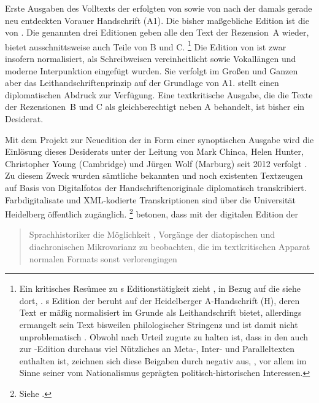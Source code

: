 Erste Ausgaben des Volltexts der \KC{} erfolgten von \citet{massmann:kukb}
sowie von \citet{diemer1849} nach der damals gerade neu entdeckten Vorauer
Handschrift (A1). Die bisher maßgebliche Edition ist die von
\citet{schroeder1895}. Die genannten drei Editionen geben alle den Text
der Rezension~A wieder, \citeauthor{massmann:kukb} bietet ausschnittsweise auch
Teile von B und C.%
%
	\footnote{Ein kritisches Resümee zu \citeauthor{massmann:kukb}s
		Editionstätigkeit zieht \citet{wolf2023}, in Bezug auf die
		\KC{} siehe dort, .
		\citeauthor{massmann:kukb}s Edition der \KC{} beruht auf der
		Heidelberger A-Handschrift (H), deren Text er mäßig normalisiert im
		Grunde als Leithandschrift bietet, allerdings ermangelt sein Text
		bisweilen philologischer Stringenz und ist damit nicht unproblematisch
		\autocite[125--126]{wolf2023}. Obwohl \citeauthor{massmann:kukb} nach
		 Urteil zugute zu halten ist, dass in den
		 auch zur \KC{}-Edition durchaus
		viel Nützliches an Meta-, Inter- und Paralleltexten enthalten ist,
		zeichnen sich diese Beigaben durch  negativ aus,
		, vor allem im
		Sinne seiner vom Nationalismus geprägten politisch-historischen
		Interessen.%
	}
%
Die Edition von \citeauthor{schroeder1895} ist zwar insofern normalisiert, als
Schreibweisen vereinheitlicht sowie Vokal\-längen und moderne Interpunktion
eingefügt wurden. Sie verfolgt im Großen und Ganzen aber das
Leit\-handschriften\-prinzip auf der Grundlage von A1. \citeauthor{diemer1849}
stellt einen diplomatischen Abdruck zur Verfügung. Eine textkritische Ausgabe,
die die Texte der Rezensionen~B und C als gleichberechtigt neben A behandelt,
ist bisher ein Desiderat.

Mit dem Projekt zur Neuedition der \KC{} in Form einer synoptischen Ausgabe
wird die Einlösung dieses Desiderats unter der Leitung von Mark Chinca, Helen
Hunter, Christopher Young (Cambridge) und Jürgen Wolf (Marburg) seit 2012
verfolgt \autocite{chincaetal2019b}. Zu diesem Zweck wurden sämtliche bekannten
und noch existenten Textzeugen auf Basis von Digitalfotos der
Handschriften\-originale diplomatisch transkribiert. Farb\-digitalisate und
XML-ko\-dier\-te Transkriptionen sind über die Universität Heidelberg
öffentlich zugänglich.%
%
	\footnote{Siehe \nocite{kcdigital}.}
%
\citet[287]{chincaetal2019b} betonen, dass mit der digitalen Edition der
\KC{} \blockquote{Sprachhistoriker \textelp{} die Möglichkeit ,
Vorgänge der dia\-topischen und dia\-chronischen Mikrovarianz zu beobachten,
die im textkritischen Apparat normalen Formats sonst verlorengingen}.

